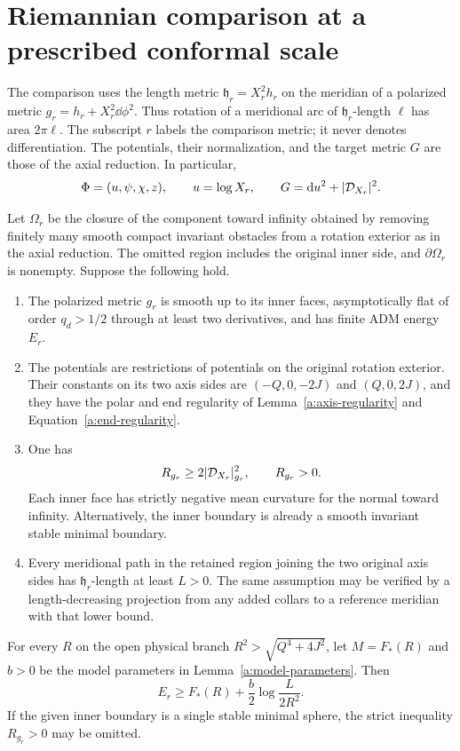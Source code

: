 \section{Riemannian comparison at a prescribed conformal scale}
\label{r:section}

The comparison uses the length metric $\mathfrak h_r=X_r^2h_r$
on the meridian of a polarized metric $g_r=h_r+X_r^2\dd\phi^2$.
Thus rotation of a meridional arc of $\mathfrak h_r$-length $\ell$
has area $2\pi\ell$.  The subscript $r$ labels the comparison metric;
it never denotes differentiation.  The potentials, their normalization,
and the target metric $G$ are those of the axial reduction.  In particular,
\[
 \Phi=(u,\psi,\chi,z),\qquad u=\log X_r,
 \qquad G=\mathrm d u^2+|\mathcal D_{X_r}|^2.
\]

\begin{proposition}\label{r:comparison}
Let $\Omega_r$ be the closure of the component toward infinity obtained
by removing finitely many smooth compact invariant obstacles from a
rotation exterior as in the axial reduction.  The omitted region includes
the original inner side, and $\partial\Omega_r$ is nonempty.  Suppose the
following hold.
\begin{enumerate}[label=\textup{(\roman*)}]
\item The polarized metric $g_r$ is smooth up to its inner faces,
asymptotically flat of order $q_d>1/2$ through at least two derivatives,
and has finite ADM energy $E_r$.
\item The potentials are restrictions of potentials on the original
rotation exterior.  Their constants on its two axis sides are
$(-Q,0,-2J)$ and $(Q,0,2J)$, and they have the polar and end regularity
of Lemma~\ref{a:axis-regularity} and Equation~\eqref{a:end-regularity}.
\item One has
\begin{equation}\label{r:scalar-hypothesis}
 R_{g_r}\ge 2|\mathcal D_{X_r}|_{g_r}^2,\qquad R_{g_r}>0.
\end{equation}
Each inner face has strictly negative mean curvature for the normal
toward infinity.  Alternatively, the inner boundary is already a smooth
invariant stable minimal boundary.
\item Every meridional path in the retained region joining the two
original axis sides has $\mathfrak h_r$-length at least $L>0$.
The same assumption may be verified by a length-decreasing projection
from any added collars to a reference meridian with that lower bound.
\end{enumerate}
For every $R$ on the open physical branch
$R^2>\sqrt{Q^4+4J^2}$, let $M=F_*(R)$ and $b>0$ be the model
parameters in Lemma~\ref{a:model-parameters}.  Then
\begin{equation}\label{r:mass-bound}
 E_r\ge F_*(R)+\frac b2\log\frac{L}{2R^2}.
\end{equation}
If the given inner boundary is a single stable minimal sphere, the strict
inequality $R_{g_r}>0$ may be omitted.
\end{proposition}

